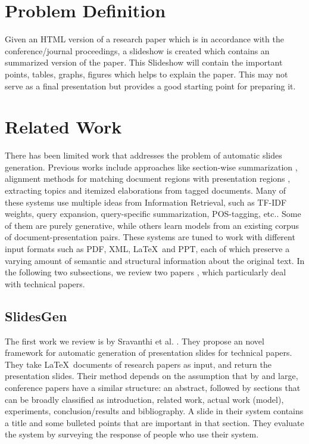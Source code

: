 \documentclass[conference]{IEEEtran}
\begin{document}
\section{Problem Definition}
Given an HTML version of a research paper which is in accordance with the conference/journal
proceedings, a slideshow is created which contains an summarized version of the paper.
This Slideshow will contain the important points, tables, graphs, figures which helps to
explain the paper. This may not serve as a final presentation but provides a good starting
point for preparing it.

\section{Related Work}
There has been limited work that addresses the problem of automatic slides generation.
Previous works include approaches like section-wise summarization \cite{sravanthi},
alignment methods for matching document regions with presentation regions \cite{brandon},
extracting topics and itemized elaborations from tagged documents.
Many of these systems use multiple ideas from Information Retrieval, such as TF-IDF weights,
query expansion, query-specific summarization, POS-tagging, etc..
Some of them are purely generative, while others learn models from an existing corpus of
document-presentation pairs. These systems are tuned to work with different input formats
such as PDF, XML, \LaTeX\ and PPT, each of which preserve a varying amount of semantic and
structural information about the original text. In the following two subsections, we review
two papers \cite{sravanthi},\cite{brandon} which particularly deal with technical papers.

\subsection{SlidesGen}
The first work we review is by Sravanthi et al. \cite{sravanthi}. They propose an
novel framework for automatic generation of presentation slides for technical papers.
They take \LaTeX\ documents of research papers as input, and return the presentation slides.
Their method depends on the assumption that by and large, conference papers have a similar structure:
an abstract, followed by sections that can be broadly classified as introduction, related work,
actual work (model), experiments, conclusion/results and bibliography.
A slide in their system contains a title and some bulleted points that are important in 
that section. They evaluate the system by surveying the response of people who use their system.
\end{document}
